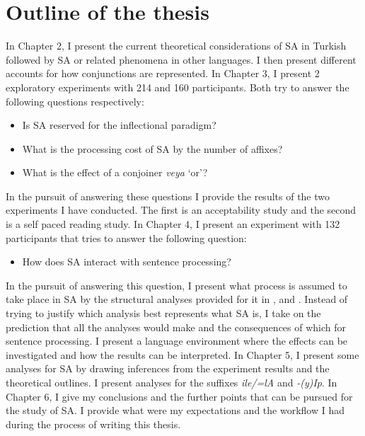 \section{Outline of the thesis}

In Chapter 2, I present the current theoretical considerations of SA in Turkish followed by SA or related phenomena in other languages. I then present different accounts for how conjunctions are represented. In Chapter 3, I present 2 exploratory experiments with 214 and 160 participants. Both try to answer the following questions respectively:

\begin{itemize}
    \item Is SA reserved for the inflectional paradigm?
    \item What is the processing cost of SA by the number of affixes?
    \item What is the effect of a conjoiner \textit{veya} `or'?
\end{itemize}

In the pursuit of answering these questions I provide the results of the two experiments I have conducted.
The first is an acceptability study and the second is a self paced reading study. In Chapter 4, I present an experiment with 132 participants that tries to answer the following question:
\begin{itemize}
    \item How does SA interact with sentence processing?
\end{itemize}
In the pursuit of answering this question, I present what process is assumed to take place in SA by the structural analyses provided for it in \citet{broadwell2008turkish,kornfilt2012revisiting,guseva2017postsyntactic}, and \citet{erschler2018suspended}. Instead of trying to justify which analysis best represents what SA is, I take on the prediction that all the analyses would make and the consequences of which for sentence processing. I present a language environment where the effects can be investigated and how the results can be interpreted. In Chapter 5, I present some analyses for SA by drawing inferences from the experiment results and the theoretical outlines. I present analyses for the suffixes \textit{ile/=lA} and \textit{-(y)Ip}. In Chapter 6, I give my conclusions and the further points that can be pursued for the study of SA. I provide what were my expectations and the workflow I had during the process of writing this thesis. 